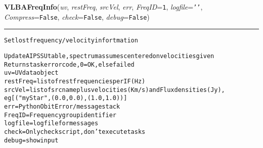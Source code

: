     \begin{boxedminipage}{\textwidth}

    \raggedright \textbf{VLBAFreqInfo}(\textit{uv}, \textit{restFreq}, \textit{srcVel}, \textit{err}, \textit{FreqID}=\texttt{1\-}, \textit{logfile}=\texttt{'\-'\-}, \textit{Compress}=\texttt{F\-a\-l\-s\-e\-}, \textit{check}=\texttt{F\-a\-l\-s\-e\-}, \textit{debug}=\texttt{F\-a\-l\-s\-e\-})

    \vspace{-1.5ex}

    \rule{\textwidth}{0.5\fboxrule}
\begin{alltt}
Set lost frequency/velocity infortmation

Update AIPS SU table, spectrum assumes centered on velocities given
Returns task error code, 0=OK, else failed
uv         = UV data object
restFreq   = list of rest frequencies per IF (Hz)
srcVel     = list of src name plus velocities (Km/s) and Flux densities (Jy), 
             eg [("myStar", (0.0,0.0), (1.0,1.0))]  
err        = Python Obit Error/message stack
FreqID     = Frequency group identifier
logfile    = logfile for messages
check      = Only check script, don't execute tasks
debug      = show input\end{alltt}

    \vspace{1ex}

    \end{boxedminipage}

    \label{VLBACal:VLBAGoodCal}
    \vspace{0.5ex}

